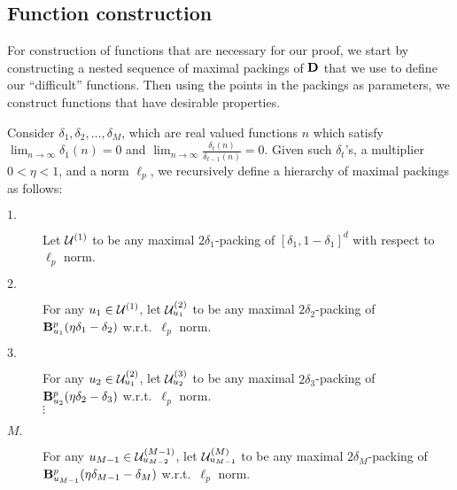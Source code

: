 \subsection{Function construction}
\label{sec:proof-lbmain-const}



For construction of functions that are necessary for our proof, we start by constructing
a nested sequence of maximal packings of $\domain$ that we use to define our ``difficult'' functions.
Then using the points in the packings as parameters, we construct functions that have desirable properties.

Consider $\delta_1, \delta_2, \dots, \delta_M$, which are real valued functions $n$ which satisfy $\lim_{n\rightarrow \infty} \delta_1(n) = 0$ and $\lim_{n\rightarrow \infty}\frac{\delta_t(n)}{\delta_{t-1}(n)} = 0$. 
Given such $\delta_t$'s, a multiplier $0<\eta<1$, and a norm $\ell_p$, 
we recursively define a hierarchy of maximal packings as follows:
\begin{description}
	\item[$1.$] Let $\Uone$ to be any maximal $2\delta_1$-packing of $[\delta_1, 1-\delta_1]^d$ with respect to $\ell_p$ norm.
	\item[$2.$] For any $u_1 \in \Uone$, let $\Utwo$ to be any maximal $2\delta_2$-packing of $\ballp{u_1}{\eta\delta_1-\delta_2}$ w.r.t.\ $\ell_p$ norm.
	\item[$3.$] For any $u_2 \in \Utwo$, let $\Utemp{2}{3}$ to be any maximal $2\delta_3$-packing of $\ballp{u_2}{\eta\delta_2-\delta_3}$ w.r.t.\ $\ell_p$ norm.\\ $\vdots$
	\item[$M.$] For any $u_{M-1} \in \Utemp{M-2}{M-1}$, let $\UM$ to be any maximal $2\delta_M$-packing of $\ballp{u_{M-1}}{\eta\delta_{M-1}-\delta_M}$ w.r.t.\ $\ell_p$ norm.
\end{description}

